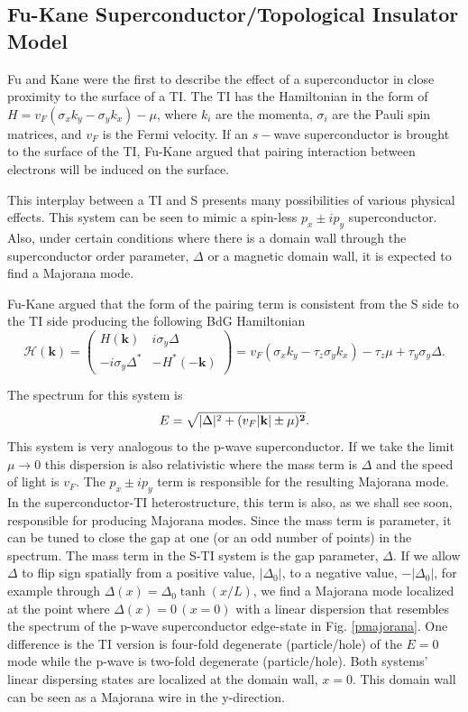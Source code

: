 \subsection{Fu-Kane Superconductor/Topological Insulator Model}
Fu and Kane were the first to describe the effect of a superconductor in close proximity to the surface of a TI\cite{majorana}. The TI has the Hamiltonian in the form of $H=v_F(\sigma_x k_y-\sigma_y k_x) - \mu$, where $k_i$ are the momenta, $\sigma_i$ are the Pauli spin matrices, and $v_F$ is the Fermi velocity. If an $s-$wave superconductor is brought to the surface of the TI, Fu-Kane argued that pairing interaction between electrons will be induced on the surface. 

This interplay between a TI and S presents many possibilities of various physical effects. This system can be seen to mimic a spin-less $p_x\pm ip_y$ superconductor. Also, under certain conditions where there is a domain wall through the superconductor order parameter, $\Delta$ or a magnetic domain wall, it is expected to find a Majorana mode. 

Fu-Kane argued that the form of the pairing term is consistent from the S side to the TI side producing the following BdG Hamiltonian
\begin{equation}
\mathcal{H}(\mathbf{k})=\left(
\begin{array}{cc}
H(\mathbf{k})  &  i\sigma_y  \Delta \\
-i\sigma_y \Delta^*  &   - H^*(-\mathbf{k})
\end{array}
\right)=v_F(\sigma_x k_y-\tau_z\sigma_y k_x) - \tau_z\mu +\tau_y\sigma_y\Delta.
\end{equation}

The spectrum for this system is
\begin{equation}
E=\sqrt{|\Delta|^2 +(v_F |\bf{k}|\pm \mu)^2}.
\end{equation}
This system is very analogous to the p-wave superconductor. If we take the limit $\mu\rightarrow 0$ this dispersion is also relativistic where the mass term is $\Delta$ and the speed of light is $v_F$. The $p_x\pm ip_y$ term is responsible for the resulting Majorana mode. In the superconductor-TI heterostructure, this term is also, as we shall see soon, responsible for producing Majorana modes.
Since the mass term is parameter, it can be tuned to close the gap at one (or an odd number of points) in the spectrum. The mass term in the S-TI system is the gap parameter, $\Delta$. If we allow $\Delta$ to flip sign spatially from a positive value, $|\Delta_0|$, to a negative value, $-|\Delta_0|$, for example through $\Delta(x)=\Delta_0 \tanh( x/L)$, we find a Majorana mode localized at the point where $\Delta(x)=0\, (x=0)$ with a linear dispersion that resembles the spectrum of the p-wave superconductor edge-state in Fig. \ref{pmajorana}. One difference is the TI version is four-fold degenerate (particle/hole) of the $E=0$ mode while the p-wave is two-fold degenerate (particle/hole). Both systems' linear dispersing states are localized at the domain wall, $x=0$. This domain wall can be seen as a Majorana wire in the y-direction.

